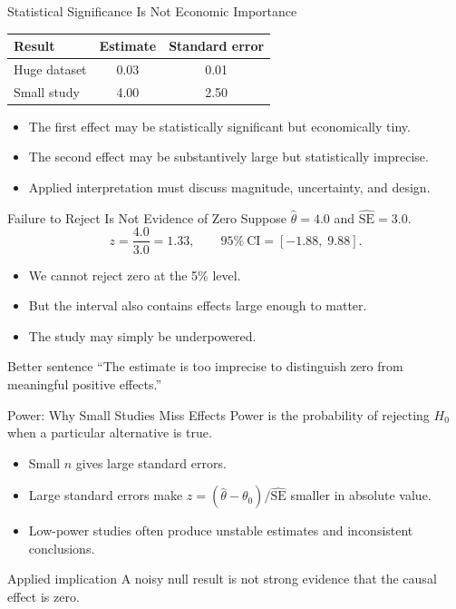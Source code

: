 \documentclass[11pt,aspectratio=169]{beamer}
\newcommand{\se}{\mathrm{SE}}
\newcommand{\CI}{\mathrm{CI}}
\begin{document}
\begin{frame}{Statistical Significance Is Not Economic Importance}
  \begin{center}
  \begin{tabular}{lcc}
    \toprule
    Result & Estimate & Standard error \\
    \midrule
    Huge dataset & 0.03 & 0.01 \\
    Small study & 4.00 & 2.50 \\
    \bottomrule
  \end{tabular}
  \end{center}
  \vspace{0.4em}
  \begin{itemize}
    \item The first effect may be statistically significant but economically tiny.
    \item The second effect may be substantively large but statistically imprecise.
    \item Applied interpretation must discuss magnitude, uncertainty, and design.
  \end{itemize}
\end{frame}

\begin{frame}{Failure to Reject Is Not Evidence of Zero}
  Suppose \(\hat{\theta}=4.0\) and \(\widehat{\se}=3.0\).
  \[
    z=\frac{4.0}{3.0}=1.33,
    \qquad
    95\%~\CI=[-1.88,\;9.88].
  \]
  \begin{itemize}
    \item We cannot reject zero at the 5\% level.
    \item But the interval also contains effects large enough to matter.
    \item The study may simply be underpowered.
  \end{itemize}
  \begin{block}{Better sentence}
    ``The estimate is too imprecise to distinguish zero from meaningful positive effects.''
  \end{block}
\end{frame}

\begin{frame}{Power: Why Small Studies Miss Effects}
  Power is the probability of rejecting \(H_0\) when a particular alternative is true.
  \begin{itemize}
    \item Small \(n\) gives large standard errors.
    \item Large standard errors make \(z=(\hat{\theta}-\theta_0)/\widehat{\se}\) smaller in absolute value.
    \item Low-power studies often produce unstable estimates and inconsistent conclusions.
  \end{itemize}
  \begin{block}{Applied implication}
    A noisy null result is not strong evidence that the causal effect is zero.
  \end{block}
\end{frame}
\end{document}
